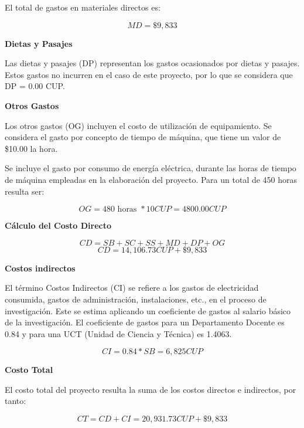 El total de gastos en materiales directos es:

\begin{equation}
    MD = \$9,833
\end{equation}

\textbf{Dietas y Pasajes}

Las dietas y pasajes (DP) representan los gastos ocasionados por dietas y pasajes. Estos gastos no incurren en el caso de este proyecto, por lo que se considera que DP = 0.00  CUP.

\textbf{Otros Gastos}

Los otros gastos (OG) incluyen el costo de utilización de equipamiento. Se considera el gasto por
concepto de tiempo de máquina, que tiene un valor de \$10.00 la hora.

Se incluye el gasto por consumo de energía eléctrica, durante las horas de tiempo de máquina empleadas
en la elaboración del proyecto. Para un total de 450 horas resulta ser:

\begin{equation}
    OG = 480 \text{ horas } * 10 CUP= 4800.00 CUP
\end{equation}





\textbf{Cálculo del Costo Directo}

\begin{equation}
    CD = SB + SC + SS + MD + DP + OG
\end{equation}
\begin{equation}
    CD = 14,106.73  CUP+ \$9,833
\end{equation}

\textbf{Costos indirectos}

El término Costos Indirectos (CI) se refiere a los gastos de electricidad consumida, gastos de administración,
instalaciones, etc., en el proceso de investigación. Este se estima aplicando un coeficiente de gastos al
salario básico de la investigación. El coeficiente de gastos para un Departamento Docente es 0.84 y para una
UCT (Unidad de Ciencia y Técnica) es 1.4063.

\begin{equation}
    CI = 0.84 * SB = 6,825  CUP
\end{equation}

\textbf{Costo Total}

El costo total del proyecto resulta la suma de los costos directos e indirectos, por tanto:

\begin{equation}
    CT = CD + CI = 20,931.73 CUP + \$9, 833
\end{equation}

